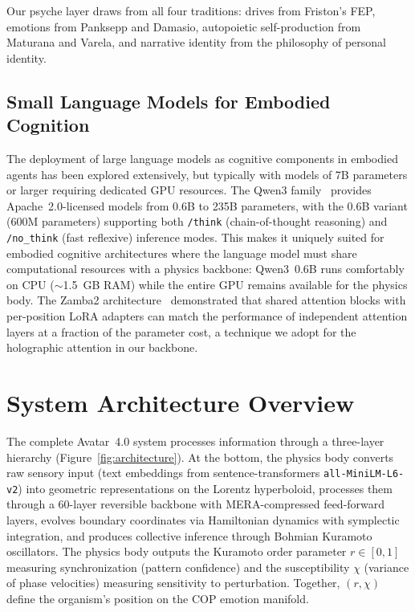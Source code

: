 \documentclass[11pt,a4paper,twocolumn]{article}
\begin{document}
Our psyche layer draws from all four traditions: drives from Friston's FEP, emotions from Panksepp and Damasio, autopoietic self-production from Maturana and Varela, and narrative identity from the philosophy of personal identity.

\subsection{Small Language Models for Embodied Cognition}

The deployment of large language models as cognitive components in embodied agents has been explored extensively, but typically with models of 7B parameters or larger requiring dedicated GPU resources.
The Qwen3 family~\cite{qwen3_2026} provides Apache~2.0-licensed models from 0.6B to 235B parameters, with the 0.6B variant (600M parameters) supporting both \texttt{/think} (chain-of-thought reasoning) and \texttt{/no\_think} (fast reflexive) inference modes.
This makes it uniquely suited for embodied cognitive architectures where the language model must share computational resources with a physics backbone: Qwen3~0.6B runs comfortably on CPU ($\sim$1.5~GB RAM) while the entire GPU remains available for the physics body.
The Zamba2 architecture~\cite{zamba2024,zamba2_2024} demonstrated that shared attention blocks with per-position LoRA adapters can match the performance of independent attention layers at a fraction of the parameter cost, a technique we adopt for the holographic attention in our backbone.

\section{System Architecture Overview}

The complete Avatar~4.0 system processes information through a three-layer hierarchy (Figure~\ref{fig:architecture}).
At the bottom, the physics body converts raw sensory input (text embeddings from sentence-transformers \texttt{all-MiniLM-L6-v2}) into geometric representations on the Lorentz hyperboloid, processes them through a 60-layer reversible backbone with MERA-compressed feed-forward layers, evolves boundary coordinates via Hamiltonian dynamics with symplectic integration, and produces collective inference through Bohmian Kuramoto oscillators.
The physics body outputs the Kuramoto order parameter $r \in [0,1]$ measuring synchronization (pattern confidence) and the susceptibility $\chi$ (variance of phase velocities) measuring sensitivity to perturbation. Together, $(r, \chi)$ define the organism's position on the COP emotion manifold.
\end{document}

